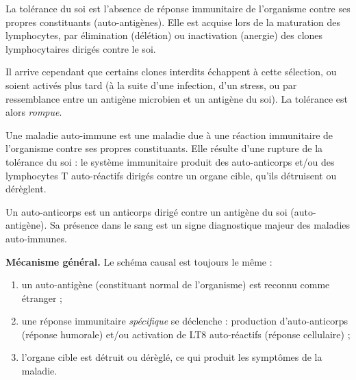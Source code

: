 \documentclass[11pt]{article}
\newcommand{\cle}[1]{{\popxbold\color{popdark}#1}}
\begin{document}
\begin{definition}
La \cle{tolérance du soi} est l'absence de réponse immunitaire de l'organisme contre ses propres constituants (auto-antigènes). Elle est acquise lors de la maturation des lymphocytes, par élimination (délétion) ou inactivation (anergie) des clones lymphocytaires dirigés contre le soi.
\end{definition}

Il arrive cependant que certains clones \og interdits \fg{} échappent à cette sélection, ou soient activés plus tard (à la suite d'une infection, d'un stress, ou par ressemblance entre un antigène microbien et un antigène du soi). La tolérance est alors \emph{rompue}.

\begin{definition}
Une \cle{maladie auto-immune} est une maladie due à une réaction immunitaire de l'organisme contre ses propres constituants. Elle résulte d'une \cle{rupture de la tolérance du soi} : le système immunitaire produit des \cle{auto-anticorps} et/ou des \cle{lymphocytes T auto-réactifs} dirigés contre un organe cible, qu'ils détruisent ou dérèglent.
\end{definition}

\begin{definition}
Un \cle{auto-anticorps} est un anticorps dirigé contre un antigène du soi (auto-antigène). Sa présence dans le sang est un signe diagnostique majeur des maladies auto-immunes.
\end{definition}

\textbf{Mécanisme général.} Le schéma causal est toujours le même :
\begin{enumerate}
\item un \cle{auto-antigène} (constituant normal de l'organisme) est reconnu comme étranger ;
\item une réponse immunitaire \emph{spécifique} se déclenche : production d'auto-anticorps (réponse humorale) et/ou activation de LT8 auto-réactifs (réponse cellulaire) ;
\item l'organe cible est détruit ou dérèglé, ce qui produit les symptômes de la maladie.
\end{enumerate}
\end{document}
